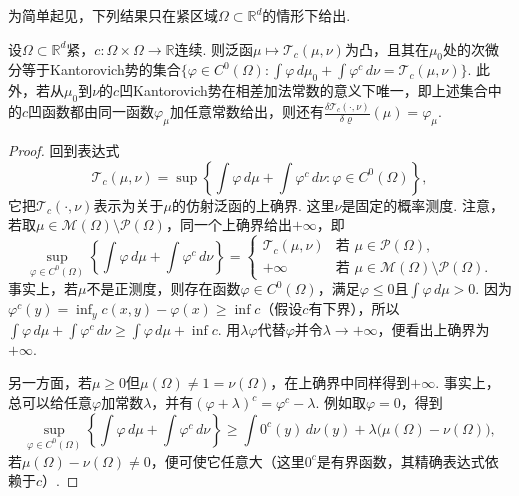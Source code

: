 为简单起见，下列结果只在紧区域$\Omega\subset\mathbb R^d$的情形下给出.
\begin{proposition}\label{obj:7.17}
设$\Omega\subset\mathbb R^d$紧，$c:\Omega\times\Omega\to\mathbb R$连续. 则泛函$\mu\mapsto\mathscr T_c(\mu,\nu)$为凸，且其在$\mu_0$处的次微分等于Kantorovich势的集合$\{\varphi\in C^0(\Omega):\int\varphi\,d\mu_0+\int\varphi^c\,d\nu=\mathscr T_c(\mu,\nu)\}$. 此外，若从$\mu_0$到$\nu$的$c$凹Kantorovich势在相差加法常数的意义下唯一，即上述集合中的$c$凹函数都由同一函数$\varphi_\mu$加任意常数给出，则还有$\frac{\delta\mathscr T_c(\cdot,\nu)}{\delta\varrho}(\mu)=\varphi_\mu$.
\end{proposition}
\begin{proof}
回到表达式
\[
 \mathscr T_c(\mu,\nu)=\sup\left\{\int\varphi\,d\mu+\int\varphi^c\,d\nu:
                                      \varphi\in C^0(\Omega)\right\},
\]
它把$\mathscr T_c(\cdot,\nu)$表示为关于$\mu$的仿射泛函的上确界. 这里$\nu$是固定的概率测度. 注意，若取$\mu\in\mathscr M(\Omega)\setminus\mathscr P(\Omega)$，同一个上确界给出$+\infty$，即
\[
 \sup_{\varphi\in C^0(\Omega)}\left\{\int\varphi\,d\mu+\int\varphi^c\,d\nu\right\}
 =\begin{cases}\mathscr T_c(\mu,\nu)&\text{若 }\mu\in\mathscr P(\Omega),\\
 +\infty&\text{若 }\mu\in\mathscr M(\Omega)\setminus\mathscr P(\Omega).
 \end{cases}
\]
事实上，若$\mu$不是正测度，则存在函数$\varphi\in C^0(\Omega)$，满足$\varphi\leq0$且$\int\varphi\,d\mu>0$. 因为$\varphi^c(y)=\inf_y c(x,y)-\varphi(x)\geq\inf c$（假设$c$有下界），所以$\int\varphi\,d\mu+\int\varphi^c\,d\nu\geq\int\varphi\,d\mu+\inf c$. 用$\lambda\varphi$代替$\varphi$并令$\lambda\to+\infty$，便看出上确界为$+\infty$.

另一方面，若$\mu\geq0$但$\mu(\Omega)\ne1=\nu(\Omega)$，在上确界中同样得到$+\infty$. 事实上，总可以给任意$\varphi$加常数$\lambda$，并有$(\varphi+\lambda)^c=\varphi^c-\lambda$. 例如取$\varphi=0$，得到
\[
 \sup_{\varphi\in C^0(\Omega)}\left\{\int\varphi\,d\mu+\int\varphi^c\,d\nu\right\}
 \geq\int0^c(y)\,d\nu(y)+\lambda\bigl(\mu(\Omega)-\nu(\Omega)\bigr),
\]
若$\mu(\Omega)-\nu(\Omega)\ne0$，便可使它任意大（这里$0^c$是有界函数，其精确表达式依赖于$c$）.


\end{proof}
